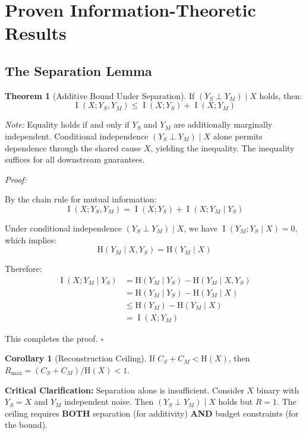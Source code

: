 \documentclass[11pt,a4paper]{article}
\theoremstyle{definition}
\newtheorem{theorem}{Theorem}[section]
\newtheorem{corollary}{Corollary}[theorem]
\DeclareMathOperator{\I}{I}
\newcommand{\Entropy}{\mathrm{H}}
\newcommand{\given}{\mid}
\newcommand{\indep}{\perp}
\begin{document}
\section{Proven Information-Theoretic Results}

\subsection{The Separation Lemma}

\begin{theorem}[Additive Bound Under Separation]\label{thm:separation}
If $(Y_S \indep Y_M) \given X$ holds, then:
\[
\I(X; Y_S, Y_M) \leq \I(X; Y_S) + \I(X; Y_M)
\]
\end{theorem}

\textit{Note:} Equality holds if and only if $Y_S$ and $Y_M$ are additionally marginally independent. Conditional independence $(Y_S \indep Y_M) \given X$ alone permits dependence through the shared cause $X$, yielding the inequality. The inequality suffices for all downstream guarantees.

\textit{Proof:}

By the chain rule for mutual information:
\[
\I(X; Y_S, Y_M) = \I(X; Y_S) + \I(X; Y_M \given Y_S)
\]

Under conditional independence $(Y_S \indep Y_M) \given X$, we have $\I(Y_M; Y_S \given X) = 0$, which implies:
\[
\Entropy(Y_M \given X, Y_S) = \Entropy(Y_M \given X)
\]

Therefore:
\begin{align}
\I(X; Y_M \given Y_S) &= \Entropy(Y_M \given Y_S) - \Entropy(Y_M \given X, Y_S) \\
&= \Entropy(Y_M \given Y_S) - \Entropy(Y_M \given X) \\
&\leq \Entropy(Y_M) - \Entropy(Y_M \given X) \\
&= \I(X; Y_M)
\end{align}

This completes the proof. $\square$

\begin{corollary}[Reconstruction Ceiling]\label{cor:ceiling}
If $C_S + C_M < \Entropy(X)$, then $R_{\max} = (C_S + C_M)/\Entropy(X) < 1$.
\end{corollary}

\textbf{Critical Clarification:} Separation alone is insufficient. Consider $X$ binary with $Y_S = X$ and $Y_M$ independent noise. Then $(Y_S \indep Y_M) \given X$ holds but $R = 1$. The ceiling requires \textbf{BOTH} separation (for additivity) \textbf{AND} budget constraints (for the bound).
\end{document}
